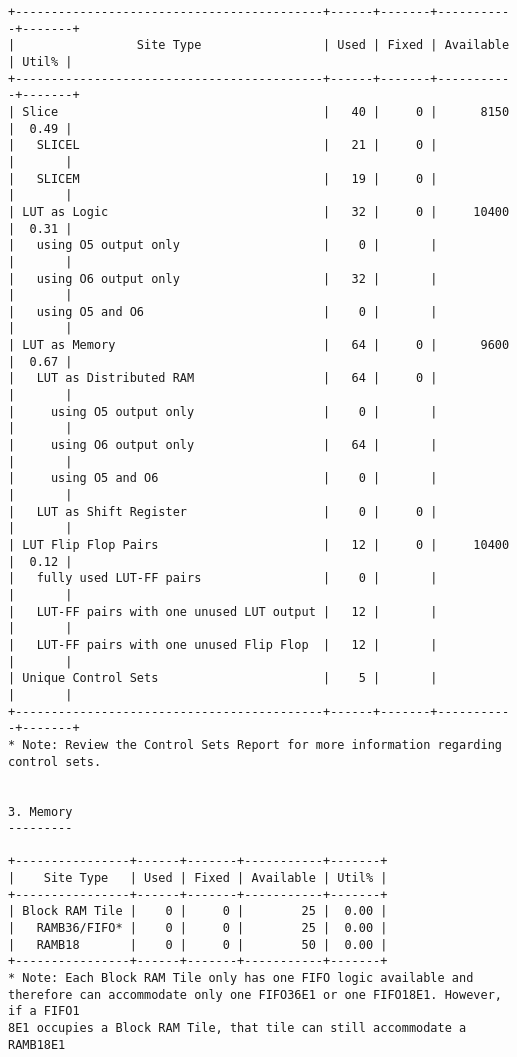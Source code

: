 \begin{verbatim}
+-------------------------------------------+------+-------+-----------+-------+
|                 Site Type                 | Used | Fixed | Available | Util% |
+-------------------------------------------+------+-------+-----------+-------+
| Slice                                     |   40 |     0 |      8150 |  0.49 |
|   SLICEL                                  |   21 |     0 |           |       |
|   SLICEM                                  |   19 |     0 |           |       |
| LUT as Logic                              |   32 |     0 |     10400 |  0.31 |
|   using O5 output only                    |    0 |       |           |       |
|   using O6 output only                    |   32 |       |           |       |
|   using O5 and O6                         |    0 |       |           |       |
| LUT as Memory                             |   64 |     0 |      9600 |  0.67 |
|   LUT as Distributed RAM                  |   64 |     0 |           |       |
|     using O5 output only                  |    0 |       |           |       |
|     using O6 output only                  |   64 |       |           |       |
|     using O5 and O6                       |    0 |       |           |       |
|   LUT as Shift Register                   |    0 |     0 |           |       |
| LUT Flip Flop Pairs                       |   12 |     0 |     10400 |  0.12 |
|   fully used LUT-FF pairs                 |    0 |       |           |       |
|   LUT-FF pairs with one unused LUT output |   12 |       |           |       |
|   LUT-FF pairs with one unused Flip Flop  |   12 |       |           |       |
| Unique Control Sets                       |    5 |       |           |       |
+-------------------------------------------+------+-------+-----------+-------+
* Note: Review the Control Sets Report for more information regarding control sets.


3. Memory
---------

+----------------+------+-------+-----------+-------+
|    Site Type   | Used | Fixed | Available | Util% |
+----------------+------+-------+-----------+-------+
| Block RAM Tile |    0 |     0 |        25 |  0.00 |
|   RAMB36/FIFO* |    0 |     0 |        25 |  0.00 |
|   RAMB18       |    0 |     0 |        50 |  0.00 |
+----------------+------+-------+-----------+-------+
* Note: Each Block RAM Tile only has one FIFO logic available and therefore can accommodate only one FIFO36E1 or one FIFO18E1. However, if a FIFO1
8E1 occupies a Block RAM Tile, that tile can still accommodate a RAMB18E1



\end{verbatim}
